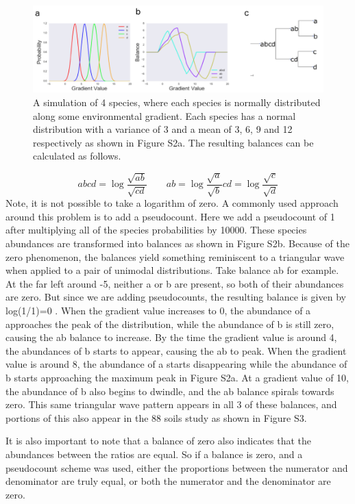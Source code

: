 \begin{figure}[H]
        \centering
        \includegraphics[width=1\textwidth]{appendix_b/sup_figure2.png}
        \caption[An ecological intrepretation of balances]{A simulation of 4 species, where each species is normally distributed along some environmental gradient.  Each species has a normal distribution with a variance of 3 and a mean of 3, 6, 9 and 12 respectively as shown in Figure S2a.  The resulting balances can be calculated as follows.}
        \label{figbS2}
\end{figure}
\[
abcd = \log \frac{\sqrt{ab}}{\sqrt{cd}} \qquad
ab = \log \frac{\sqrt{a}}{\sqrt{b}}
cd = \log \frac{\sqrt{c}}{\sqrt{d}}
\]
Note, it is not possible to take a logarithm of zero.  A commonly used approach around this problem is to add a pseudocount.  Here we add a pseudocount of 1 after multiplying all of the species probabilities by 10000.  These species abundances are transformed into balances as shown in Figure S2b.  Because of the zero phenomenon, the balances yield something reminiscent to a triangular wave when applied to a pair of unimodal distributions.  Take balance ab for example.  At the far left around -5, neither a or b are present, so both of their abundances are zero.  But since we are adding pseudocounts, the resulting balance is given by log(1/1)=0 . When the gradient value increases to 0, the abundance of a approaches the peak of the distribution, while the abundance of b is still zero, causing the ab balance to increase.  By the time the gradient value is around 4, the abundances of b starts to appear, causing the ab to peak.  When the gradient value is around 8, the abundance of a starts disappearing while the abundance of b starts approaching the maximum peak in Figure S2a.  At a gradient value of 10, the abundance of b also begins to dwindle, and the ab balance spirals towards zero.  This same triangular wave pattern appears in all 3 of these balances, and portions of this also appear in the 88 soils study as shown in Figure S3.

It is also important to note that a balance of zero also indicates that the abundances between the ratios are equal.  So if a balance is zero, and a pseudocount scheme was used, either the proportions between the numerator and denominator are truly equal, or both the numerator and the denominator are zero.\newpage
